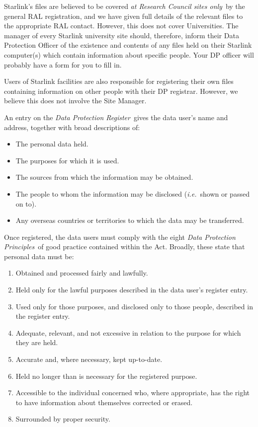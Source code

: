 \documentclass[twoside,11pt]{article}
\begin{document}
Starlink's files are believed to be covered {\em at Research Council sites
only}\, by the general RAL registration, and we have given full details of the
relevant files to the appropriate RAL contact.
However, this does not cover Universities.
The manager of every Starlink university site should, therefore, inform
their Data Protection Officer of the existence and contents of any
files held on their Starlink computer(s) which contain information about
specific people.
Your DP officer will probably have a form for you to fill in.

Users of Starlink facilities are also responsible for registering their
own files containing information on other people with their DP registrar.
However, we believe this does not involve the Site Manager.

An entry on the {\em Data Protection Register}\, gives the data user's name and
address, together with broad descriptions of:

\begin{itemize}
\item The personal data held.
\item The purposes for which it is used.
\item The sources from which the information may be obtained.
\item The people to whom the information may be disclosed ({\em i.e.}\ shown or
 passed on to).
\item Any overseas countries or territories to which the data may be transferred.
\end{itemize}

Once registered, the data users must comply with the eight {\em Data Protection
Principles}\, of good practice contained within the Act.
Broadly, these state that personal data must be:

\begin{enumerate}
\item Obtained and processed fairly and lawfully.
\item Held only for the lawful purposes described in the data user's register
 entry.
\item Used only for those purposes, and disclosed only to those people,
 described in the register entry.
\item Adequate, relevant, and not excessive in relation to the purpose for which
 they are held.
\item Accurate and, where necessary, kept up-to-date.
\item Held no longer than is necessary for the registered purpose.
\item Accessible to the individual concerned who, where appropriate, has the
 right to have information about themselves corrected or erased.
\item Surrounded by proper security.
\end{enumerate}
\end{document}

